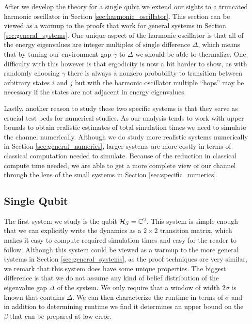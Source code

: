 After we develop the theory for a single qubit we extend our sights to a truncated harmonic oscillator in Section \ref{sec:harmonic_oscillator}. This section can be viewed as a warmup to the proofs that work for general systems in Section \ref{sec:general_systems}. One unique aspect of the harmonic oscillator is that all of the energy eigenvalues are integer multiples of single difference $\Delta$, which means that by tuning our environment gap $\gamma$ to $\Delta$ we should be able to thermalize. One difficulty with this however is that ergodicity is now a bit harder to show, as with randomly choosing $\gamma$ there is always a nonzero probability to transition between arbitrary states $i$ and $j$ but with the harmonic oscillator multiple ``hops'' may be necessary if the states are not adjacent in energy eigenvalues.

Lastly, another reason to study these two specific systems is that they serve as crucial test beds for numerical studies. As our analysis tends to work with upper bounds to obtain realistic estimates of total simulation times we need to simulate the channel numerically. Although we do study more realistic systems numerically in Section \ref{sec:general_numerics}, larger systems are more costly in terms of classical computation needed to simulate. Because of the reduction in classical compute time needed, we are able to get a more complete view of our channel through the lens of the small systems in Section \ref{sec:specific_numerics}.

\subsection{Single Qubit} \label{sec:single_qubit}
The first system we study is the qubit $\mathcal{H}_S = \mathbb{C}^2$. This system is simple enough that we can explicitly write the dynamics as a $2 \times 2$ transition matrix, which makes it easy to compute required simulation times and easy for the reader to follow. Although this system could be viewed as a warmup to the more general systems in Section \ref{sec:general_systems}, as the proof techniques are very similar, we remark that this system does have some unique properties. The biggest difference is that we do not assume any kind of belief distribution of the eigenvalue gap $\Delta$ of the system. We only require that a window of width $2 \sigma$ is known that contains $\Delta$. We can then characterize the runtime in terms of $\sigma$ and in addition to determining runtime we find it determines an upper bound on the $\beta$ that can be prepared at low error.

